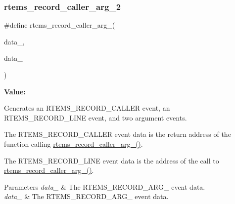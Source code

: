 \subsubsection{\texorpdfstring{rtems\_record\_caller\_arg\_2}{rtems\_record\_caller\_arg\_2}}
{\footnotesize\ttfamily \#define rtems\+\_\+record\+\_\+caller\+\_\+arg\+\_(\begin{DoxyParamCaption}\item[{}]{data\+\_,  }\item[{}]{data\+\_ }\end{DoxyParamCaption})}

{\bfseries Value\+:}
\begin{DoxyCode}{0}
\DoxyCodeLine{  )}

\end{DoxyCode}


Generates an R\+T\+E\+M\+S\+\_\+\+R\+E\+C\+O\+R\+D\+\_\+\+C\+A\+L\+L\+ER event, an R\+T\+E\+M\+S\+\_\+\+R\+E\+C\+O\+R\+D\+\_\+\+L\+I\+NE event, and two argument events. 

The R\+T\+E\+M\+S\+\_\+\+R\+E\+C\+O\+R\+D\+\_\+\+C\+A\+L\+L\+ER event data is the return address of the function calling \mbox{\hyperlink{group__RTEMSRecord_ga51b94f8e9765882257bef6eef809b9be}{rtems\+\_\+record\+\_\+caller\+\_\+arg\+\_()}}.

The R\+T\+E\+M\+S\+\_\+\+R\+E\+C\+O\+R\+D\+\_\+\+L\+I\+NE event data is the address of the call to \mbox{\hyperlink{group__RTEMSRecord_ga51b94f8e9765882257bef6eef809b9be}{rtems\+\_\+record\+\_\+caller\+\_\+arg\+\_()}}.


\begin{DoxyParams}{Parameters}
{\em data\+\_} & The R\+T\+E\+M\+S\+\_\+\+R\+E\+C\+O\+R\+D\+\_\+\+A\+R\+G\+\_ event data. \\
\hline
{\em data\+\_} & The R\+T\+E\+M\+S\+\_\+\+R\+E\+C\+O\+R\+D\+\_\+\+A\+R\+G\+\_ event data. \\
\hline
\end{DoxyParams}
\mbox{\label{group__RTEMSRecord_gaf9793b1b177584659f6cd0942c4b44a2}} 
